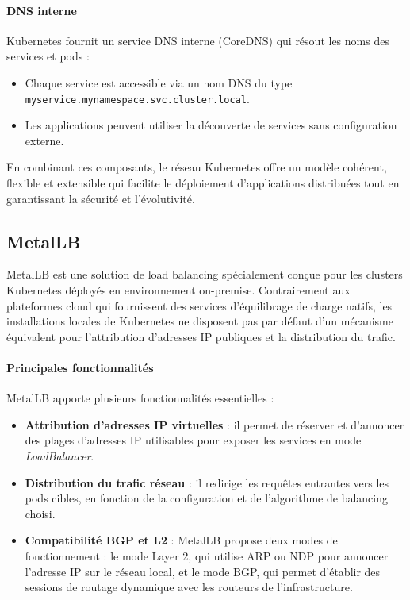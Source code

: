 \paragraph{DNS interne}

Kubernetes fournit un service DNS interne (CoreDNS) qui résout les noms des services et pods :
\begin{itemize}
	\item Chaque service est accessible via un nom DNS du type \texttt{myservice.mynamespace.svc.cluster.local}.
	\item Les applications peuvent utiliser la découverte de services sans configuration externe.
\end{itemize}

En combinant ces composants, le réseau Kubernetes offre un modèle cohérent, flexible et extensible qui facilite le déploiement d’applications distribuées tout en garantissant la sécurité et l’évolutivité.

\subsection{MetalLB}

MetalLB est une solution de load balancing spécialement conçue pour les clusters Kubernetes déployés en environnement on-premise. Contrairement aux plateformes cloud qui fournissent des services d’équilibrage de charge natifs, les installations locales de Kubernetes ne disposent pas par défaut d’un mécanisme équivalent pour l’attribution d’adresses IP publiques et la distribution du trafic.

\paragraph{Principales fonctionnalités}

MetalLB apporte plusieurs fonctionnalités essentielles :
\begin{itemize}
	\item \textbf{Attribution d’adresses IP virtuelles} : il permet de réserver et d’annoncer des plages d’adresses IP utilisables pour exposer les services en mode \emph{LoadBalancer}.
	\item \textbf{Distribution du trafic réseau} : il redirige les requêtes entrantes vers les pods cibles, en fonction de la configuration et de l’algorithme de balancing choisi.
	\item \textbf{Compatibilité BGP et L2} : MetalLB propose deux modes de fonctionnement : le mode Layer 2, qui utilise ARP ou NDP pour annoncer l’adresse IP sur le réseau local, et le mode BGP, qui permet d’établir des sessions de routage dynamique avec les routeurs de l’infrastructure.
\end{itemize}

